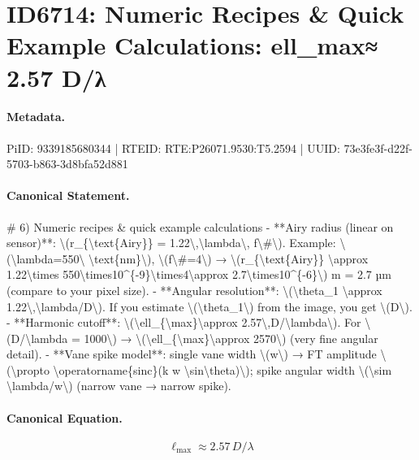 \section*{ID6714: Numeric Recipes \& Quick Example Calculations: ell\_max≈ 2.57 D/λ}
\paragraph{Metadata.}
PiID: 9339185680344 | RTEID: RTE:P26071.9530:T5.2594 | UUID: 73e3fe3f-d22f-5703-b863-3d8bfa52d881

\paragraph{Canonical Statement.}
\# 6) Numeric recipes \& quick example calculations - **Airy radius (linear on sensor)**: \textbackslash{}(r\_\{\textbackslash{}text\{Airy\}\} = 1.22\textbackslash{},\textbackslash{}lambda\textbackslash{}, f\textbackslash{}\#\textbackslash{}). Example: \textbackslash{}(\textbackslash{}lambda=550\textbackslash{} \textbackslash{}text\{nm\}\textbackslash{}), \textbackslash{}(f\textbackslash{}\#=4\textbackslash{}) → \textbackslash{}(r\_\{\textbackslash{}text\{Airy\}\} \textbackslash{}approx 1.22\textbackslash{}times 550\textbackslash{}times10\textasciicircum{}\{-9\}\textbackslash{}times4\textbackslash{}approx 2.7\textbackslash{}times10\textasciicircum{}\{-6\}\textbackslash{}) m = 2.7 µm (compare to your pixel size). - **Angular resolution**: \textbackslash{}(\textbackslash{}theta\_1 \textbackslash{}approx 1.22\textbackslash{},\textbackslash{}lambda/D\textbackslash{}). If you estimate \textbackslash{}(\textbackslash{}theta\_1\textbackslash{}) from the image, you get \textbackslash{}(D\textbackslash{}). - **Harmonic cutoff**: \textbackslash{}(\textbackslash{}ell\_\{\textbackslash{}max\}\textbackslash{}approx 2.57\textbackslash{},D/\textbackslash{}lambda\textbackslash{}). For \textbackslash{}(D/\textbackslash{}lambda = 1000\textbackslash{}) → \textbackslash{}(\textbackslash{}ell\_\{\textbackslash{}max\}\textbackslash{}approx 2570\textbackslash{}) (very fine angular detail). - **Vane spike model**: single vane width \textbackslash{}(w\textbackslash{}) → FT amplitude \textbackslash{}(\textbackslash{}propto \textbackslash{}operatorname\{sinc\}(k w \textbackslash{}sin\textbackslash{}theta)\textbackslash{}); spike angular width \textbackslash{}(\textbackslash{}sim \textbackslash{}lambda/w\textbackslash{}) (narrow vane → narrow spike).

\paragraph{Canonical Equation.}
\[
\ell_{\max}\approx 2.57\,D/\lambda
\]


